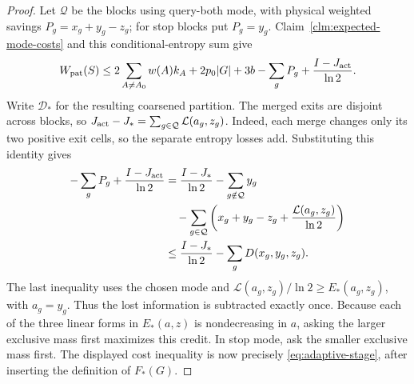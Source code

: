 \begin{proof}
Let $\mathcal Q$ be the blocks using query-both mode, with physical
weighted savings $P_g=x_g+y_g-z_g$; for stop blocks put $P_g=y_g$.
Claim~\ref{clm:expected-mode-costs} and this conditional-entropy sum give
\[
 W_{\rm pat}(S)\le
 2\sum_{A\ne A_0}w(A)k_A+2p_0|G|+3b
 -\sum_gP_g+\frac{I-J_{\rm act}}{\ln2}.
\]
Write $\mathcal D_*$ for the resulting coarsened partition.
The merged exits are disjoint across blocks, so
$J_{\rm act}-J_*=\sum_{g\in\mathcal Q}\mathcal L(a_g,z_g)$.
Indeed, each merge changes only its two positive exit cells,
so the separate entropy losses add. Substituting this identity gives
\[
 \begin{aligned}
 -\sum_gP_g+\frac{I-J_{\rm act}}{\ln2}
 &=\frac{I-J_*}{\ln2}
   -\sum_{g\notin\mathcal Q}y_g\\
 &\quad-\sum_{g\in\mathcal Q}
       \left(x_g+y_g-z_g+\frac{\mathcal L(a_g,z_g)}{\ln2}\right)\\
 &\le\frac{I-J_*}{\ln2}-\sum_gD(x_g,y_g,z_g).
 \end{aligned}
\]
The last inequality uses the chosen mode and
$\mathcal L(a_g,z_g)/\ln2\ge E_*(a_g,z_g)$, with $a_g=y_g$.
Thus the lost information is subtracted exactly once. Because
each of the three linear forms in
$E_*(a,z)$ is nondecreasing in $a$, asking the larger exclusive mass
first maximizes this credit. In stop mode, ask the smaller exclusive
mass first. The displayed cost inequality is now precisely
\eqref{eq:adaptive-stage}, after inserting the definition of $F_*(G)$.
\end{proof}

